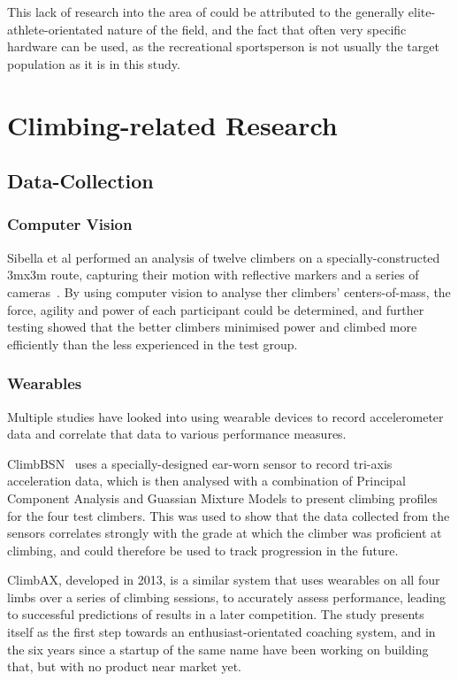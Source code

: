 This lack of research into the area of could be attributed to the generally elite-athlete-orientated nature of the field, and the fact that often very specific hardware can be used, as the recreational sportsperson is not usually the target population as it is in this study.


\section{Climbing-related Research}
\subsection{Data-Collection}

\subsubsection{Computer Vision}
Sibella et al performed an analysis of twelve climbers on a specially-constructed 3mx3m route, capturing their motion with reflective markers and a series of cameras~\cite{centreofmass}.
By using computer vision to analyse ther climbers' centers-of-mass, the force, agility and power of each participant could be determined, and further testing showed that the better climbers minimised power and climbed more efficiently than the less experienced in the test group.



\subsubsection{Wearables}
Multiple studies have looked into using wearable devices to record accelerometer data and correlate that data to various performance measures.

ClimbBSN~\cite{climbbsn} uses a specially-designed ear-worn  sensor to record tri-axis acceleration data, which is then analysed with a combination of Principal Component Analysis and Guassian Mixture Models to present climbing profiles for the four test climbers.
This was used to show that the data collected from the sensors correlates strongly with the grade at which the climber was proficient at climbing, and could therefore be used to track progression in the future.


ClimbAX, developed in 2013, \cite{climbaxstudy} is a similar system that uses wearables on all four limbs over a series of climbing sessions, to accurately assess performance, leading to successful predictions of results in a later competition.
The study presents itself as the first step towards an enthusiast-orientated coaching system, and in the six years since a startup of the same name have been working on building that, but with no product near market yet.


